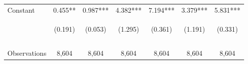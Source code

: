 \begin{center}
\begin{tabular}{lcccccc}
Constant & 0.455** & 0.987*** & 4.382*** & 7.194*** & 3.379*** & 5.831*** \\
 & \begin{footnotesize}(0.191)\end{footnotesize} & \begin{footnotesize}(0.053)\end{footnotesize} & \begin{footnotesize}(1.295)\end{footnotesize} & \begin{footnotesize}(0.361)\end{footnotesize} & \begin{footnotesize}(1.191)\end{footnotesize} & \begin{footnotesize}(0.331)\end{footnotesize} \\
 & \begin{footnotesize}[0.017]\end{footnotesize} & \begin{footnotesize}[0.000]\end{footnotesize} & \begin{footnotesize}[0.001]\end{footnotesize} & \begin{footnotesize}[0.000]\end{footnotesize} & \begin{footnotesize}[0.005]\end{footnotesize} & \begin{footnotesize}[0.000]\end{footnotesize} \\
\vspace{4pt} & \begin{footnotesize}\end{footnotesize} & \begin{footnotesize}\end{footnotesize} & \begin{footnotesize}\end{footnotesize} & \begin{footnotesize}\end{footnotesize} & \begin{footnotesize}\end{footnotesize} & \begin{footnotesize}\end{footnotesize} \\
Observations & 8,604 & 8,604 & 8,604 & 8,604 & 8,604 & 8,604 \\

\end{tabular}
\end{center}
